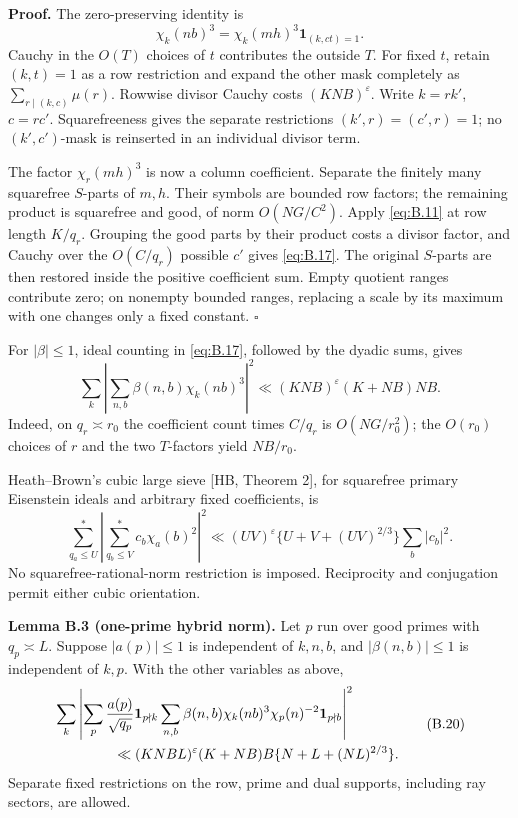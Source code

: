 \documentclass[11pt,a4paper]{article}
\begin{document}
\textbf{Proof.} The zero-preserving identity is \[
\chi_k(nb)^3=\chi_k(mh)^3\mathbf1_{(k,ct)=1}.
\] Cauchy in the \(O(T)\) choices of \(t\) contributes the outside \(T\). For fixed \(t\), retain \((k,t)=1\) as a row restriction and expand the other mask completely as \(\sum_{r\mid(k,c)}\mu(r)\). Rowwise divisor Cauchy costs \((KNB)^\varepsilon\). Write \(k=rk'\), \(c=rc'\). Squarefreeness gives the separate restrictions \((k',r)=(c',r)=1\); no \((k',c')\)-mask is reinserted in an individual divisor term.

The factor \(\chi_r(mh)^3\) is now a column coefficient. Separate the finitely many squarefree \(S\)-parts of \(m,h\). Their symbols are bounded row factors; the remaining product is squarefree and good, of norm \(O(NG/C^2)\). Apply \eqref{eq:B.11} at row length \(K/q_r\). Grouping the good parts by their product costs a divisor factor, and Cauchy over the \(O(C/q_r)\) possible \(c'\) gives \eqref{eq:B.17}. The original \(S\)-parts are then restored inside the positive coefficient sum. Empty quotient ranges contribute zero; on nonempty bounded ranges, replacing a scale by its maximum with one changes only a fixed constant. \hfill\(\square\)

For \(|\beta|\le1\), ideal counting in \eqref{eq:B.17}, followed by the dyadic sums, gives \[
\sum_k\left|\sum_{n,b}\beta(n,b)\chi_k(nb)^3\right|^2
\ll(KNB)^\varepsilon(K+NB)NB.
\tag{B.18}\label{eq:B.18}
\] Indeed, on \(q_r\asymp r_0\) the coefficient count times \(C/q_r\) is \(O(NG/r_0^2)\); the \(O(r_0)\) choices of \(r\) and the two \(T\)-factors yield \(NB/r_0\).

Heath--Brown's cubic large sieve {[}HB, Theorem 2{]}, for squarefree primary Eisenstein ideals and arbitrary fixed coefficients, is \[
 \sum_{q_a\le U}^{*}\left|\sum_{q_b\le V}^{*}c_b\chi_a(b)^2\right|^2
 \ll(UV)^\varepsilon\{U+V+(UV)^{2/3}\}\sum_b|c_b|^2.
\tag{B.19}\label{eq:B.19}
\] No squarefree-rational-norm restriction is imposed. Reciprocity and conjugation permit either cubic orientation.

\textbf{Lemma B.3 (one-prime hybrid norm).} Let \(p\) run over good primes with \(q_p\asymp L\). Suppose \(|a(p)|\le1\) is independent of \(k,n,b\), and \(|\beta(n,b)|\le1\) is independent of \(k,p\). With the other variables as above, \[
\begin{aligned}
 &\sum_k\left|\sum_p\frac{a(p)}{\sqrt{q_p}}\mathbf1_{p\nmid k}
 \sum_{n,b}\beta(n,b)\chi_k(nb)^3\chi_p(n)^{-2}\mathbf1_{p\nmid b}\right|^2\\
 &\hspace{15mm}\ll(KNBL)^\varepsilon(K+NB)B\{N+L+(NL)^{2/3}\}.
\end{aligned}
\tag{B.20}\label{eq:B.20}
\] Separate fixed restrictions on the row, prime and dual supports, including ray sectors, are allowed.
\end{document}

